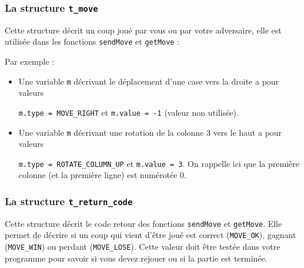 \documentclass[french,12pt,a4paper,twoside,openright,titlepage]{report}
\begin{document}
\subsubsection{La structure \texttt{t\_move}}
Cette structure décrit un coup joué par vous ou par votre adversaire, elle est utilisée dans les fonctions  \verb|sendMove| et \verb|getMove| :

Par exemple :
\begin{itemize}
\item Une variable \verb|m| décrivant le déplacement d'une case vers la droite a pour valeurs

\verb|m.type = MOVE_RIGHT| et \verb|m.value = -1| (valeur non utilisée).
\item Une variable \verb|m| décrivant une rotation de la colonne 3 vers le haut a pour valeurs

\verb|m.type = ROTATE_COLUMN_UP| et  \verb|m.value = 3|. On rappelle ici que la première colonne
(et la première ligne) est numérotée 0.
\end{itemize}

\subsubsection{La structure \texttt{t\_return\_code}}
Cette structure décrit le code retour des fonctions \verb|sendMove| et \verb|getMove|. Elle permet de décrire si un coup qui vient d'être joué
est correct (\verb|MOVE_OK|), gagnant (\verb|MOVE_WIN|) ou perdant (\verb|MOVE_LOSE|). Cette valeur doit être testée
dans votre programme pour savoir si vous devez rejouer ou si la partie est terminée.

%
\end{document}
